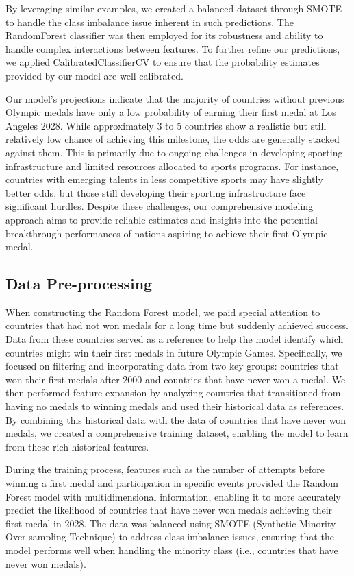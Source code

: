 \documentclass[12pt]{article}
\begin{document}
By leveraging similar examples, we created a balanced dataset through SMOTE to handle the class imbalance issue inherent in such predictions. The RandomForest classifier was then employed for its robustness and ability to handle complex interactions between features. To further refine our predictions, we applied CalibratedClassifierCV to ensure that the probability estimates provided by our model are well-calibrated.

Our model's projections indicate that the majority of countries without previous Olympic medals have only a low probability of earning their first medal at Los Angeles 2028. While approximately 3 to 5 countries show a realistic but still relatively low chance of achieving this milestone, the odds are generally stacked against them. This is primarily due to ongoing challenges in developing sporting infrastructure and limited resources allocated to sports programs. For instance, countries with emerging talents in less competitive sports may have slightly better odds, but those still developing their sporting infrastructure face significant hurdles. Despite these challenges, our comprehensive modeling approach aims to provide reliable estimates and insights into the potential breakthrough performances of nations aspiring to achieve their first Olympic medal.

\subsection{Data Pre-processing}

When constructing the Random Forest model, we paid special attention to countries that had not won medals for a long time but suddenly achieved success. Data from these countries served as a reference to help the model identify which countries might win their first medals in future Olympic Games. Specifically, we focused on filtering and incorporating data from two key groups: countries that won their first medals after 2000 and countries that have never won a medal. We then performed feature expansion by analyzing countries that transitioned from having no medals to winning medals and used their historical data as references. By combining this historical data with the data of countries that have never won medals, we created a comprehensive training dataset, enabling the model to learn from these rich historical features.

During the training process, features such as the number of attempts before winning a first medal and participation in specific events provided the Random Forest model with multidimensional information, enabling it to more accurately predict the likelihood of countries that have never won medals achieving their first medal in 2028. The data was balanced using SMOTE (Synthetic Minority Over-sampling Technique) to address class imbalance issues, ensuring that the model performs well when handling the minority class (i.e., countries that have never won medals).
\end{document}
